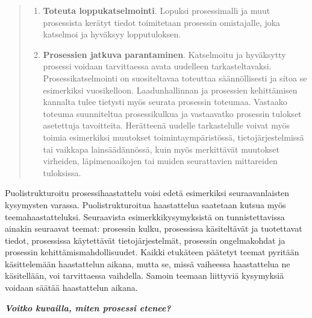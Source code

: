 \documentclass[
  finnish,
  letterpaper,
  DIV=11,
  numbers=noendperiod,
  oneside]{scrreprt}
\begin{document}
\begin{quote}
\begin{enumerate}
  esittää lyhyessä lisäpalaverissa tai kommenttipyynnön yhteydessä
  kirjallisesti ilman tarvetta uudelle haastattelukierrokselle.
\item
  \textbf{Toteuta loppukatselmointi}. Lopuksi prosessimalli ja muut
  prosessista kerätyt tiedot toimitetaan prosessin omistajalle, joka
  katselmoi ja hyväksyy lopputuloksen.
\item
  \textbf{Prosessien jatkuva parantaminen}. Katselmoitu ja hyväksytty
  prosessi voidaan tarvittaessa avata uudelleen tarkasteltavaksi.
  Prosessikatselmointi on suositeltavaa toteuttaa säännöllisesti ja
  sitoa se esimerkiksi vuosikelloon. Laadunhallinnan ja prosessien
  kehittämisen kannalta tulee tietysti myös seurata prosessin toteumaa.
  Vastaako toteuma suunniteltua prosessikulkua ja vastaavatko prosessin
  tulokset asetettuja tavoitteita. Herätteenä uudelle tarkastelulle
  voivat myös toimia esimerkiksi muutokset toimintaympäristössä,
  tietojärjestelmissä tai vaikkapa lainsäädännössä, kuin myös
  merkittävät muutokset virheiden, läpimenoaikojen tai muiden
  seurattavien mittareiden tuloksissa.
\end{enumerate}
\end{quote}

Puolistrukturoitu prosessihaastattelu voisi edetä esimerkiksi
seuraavanlaisten kysymysten varassa. Puolistrukturoitua haastattelua
saatetaan kutsua myös teemahaastatteluksi. Seuraavista
esimerkkikysymyksistä on tunnistettavissa ainakin seuraavat teemat:
prosessin kulku, prosessissa käsiteltävät ja tuotettavat tiedot,
prosessissa käytettävät tietojärjestelmät, prosessin ongelmakohdat ja
prosessin kehittämismahdollisuudet. Kaikki etukäteen päätetyt teemat
pyritään käsittelemään haastattelun aikana, mutta se, missä vaiheessa
haastattelua ne käsitellään, voi tarvittaessa vaihdella. Samoin teemaan
liittyviä kysymyksiä voidaan säätää haastattelun aikana.

\textbf{\emph{Voitko kuvailla, miten prosessi etenee?}}
\end{document}
